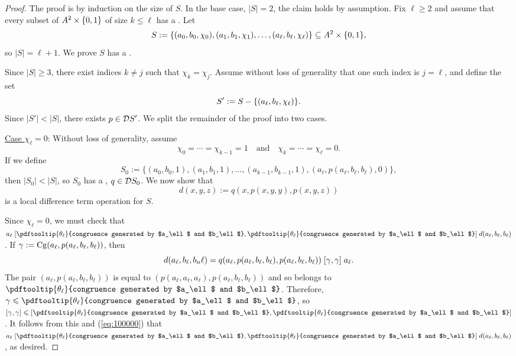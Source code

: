 \begin{proof}

The proof is by induction on the size of $S$.  In the base case,
$|S| = 2$, the claim holds by assumption. Fix $\ell\geq 2$ and assume that
every subset of $A^2 \times \{0,1\}$ of size $k \leq \ell$ has a \ldto. Let
\[
S := \{(a_0, b_0, \chi_0), (a_1, b_1, \chi_1), \dots,
        (a_{\ell}, b_{\ell},\chi_{\ell})\} \subseteq A^2 \times \{0,1\},
\]
so $|S| = \ell+1$.  We prove $S$ has a \ldto.

Since $|S| \geq 3$, %
there exist indices $k\neq j$ such that $\chi_k = \chi_j$.
Assume without loss of generality that one such index is $j=\ell$,
and define the set
\[
S' := S - \{(a_\ell, b_\ell, \chi_\ell)\}.
\]
Since $|S'| < |S|$, there exists $p \in \mathcal{D} S'$.
We split the remainder of the proof into two cases.

\medskip


\newcommand{\thetal}{\ensuremath{\pdftooltip{\theta_{\ell}}{congruence generated by $a_\ell$ and $b_\ell$}}}
\noindent \underline{Case $\chi_\ell = 0$}:
Without loss of generality, assume
\begin{equation*}
  \chi_0 = %
\cdots =\chi_{k-1} = 1 \quad \text{and} \quad
\chi_{k} = \cdots = \chi_{\ell} = 0.
\end{equation*}
If we define %
\[S_0 := \{(a_0, b_0, 1), (a_1, b_1, 1),
\dots, (a_{k-1}, b_{k-1}, 1), (a_\ell, p(a_\ell, b_\ell, b_\ell), 0)\},\]
then $|S_0| < |S|$, so $S_0$ has a \ldto, $q \in \mathcal{D} S_0$.
We now show that
\[
d(x,y,z) := q(x, p(x,y,y), p(x,y,z))
\]
is a local difference term operation for $S$.

Since $\chi_\ell =0$, we must check that
$a_\ell \comr{\thetal} d(a_\ell,b_\ell,b_\ell)$.
If $\gamma := \operatorname{Cg}(a_\ell, p(a_\ell,b_\ell,b_\ell))$, then
\begin{equation}
    \label{eq:100000}
  d(a_\ell,b_\ell,b_n\ell) =
  q(a_\ell, p(a_\ell,b_\ell,b_\ell), p(a_\ell,b_\ell,b_\ell))\mathrel{[\gamma, \gamma]} a_\ell.
\end{equation}
The pair $(a_\ell, p(a_\ell,b_\ell,b_\ell))$ is equal to
$(p(a_\ell,a_\ell,a_\ell), p(a_\ell,b_\ell,b_\ell))$ and so
belongs to $\thetal$.
Therefore, $\gamma\leq \thetal$, so
$\com{\gamma} \leq \com{\thetal}$.
It follows from this and (\ref{eq:100000}) that
$a_\ell \comr{\thetal} d(a_\ell,b_\ell,b_\ell)$, as desired.


\end{proof}
